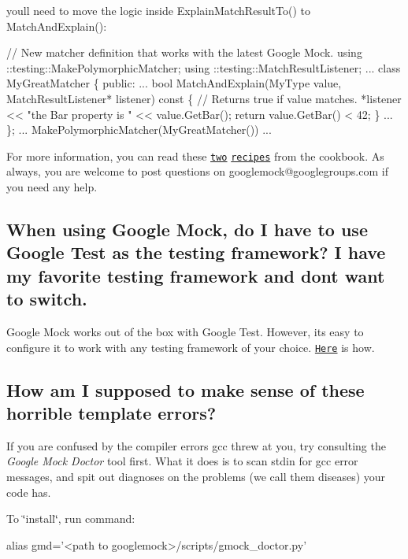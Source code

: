 you\textquotesingle{}ll need to move the logic inside {\ttfamily Explain\+Match\+Result\+To()} to {\ttfamily Match\+And\+Explain()}\+: 
\begin{DoxyCode}
\textcolor{comment}{// New matcher definition that works with the latest Google Mock.}
using ::testing::MakePolymorphicMatcher;
using ::testing::MatchResultListener;
...
class MyGreatMatcher \{
 \textcolor{keyword}{public}:
  ...
  \textcolor{keywordtype}{bool} MatchAndExplain(MyType value,
                       MatchResultListener* listener)\textcolor{keyword}{ const }\{
    \textcolor{comment}{// Returns true if value matches.}
    *listener << \textcolor{stringliteral}{"the Bar property is "} << value.GetBar();
    \textcolor{keywordflow}{return} value.GetBar() < 42;
  \}
  ...
\};
... MakePolymorphicMatcher(MyGreatMatcher()) ...
\end{DoxyCode}


For more information, you can read these \href{CookBook.md#writing-new-monomorphic-matchers}{\tt two} \href{CookBook.md#writing-new-polymorphic-matchers}{\tt recipes} from the cookbook. As always, you are welcome to post questions on {\ttfamily googlemock@googlegroups.\+com} if you need any help.

\subsection*{When using Google Mock, do I have to use Google Test as the testing framework? I have my favorite testing framework and don\textquotesingle{}t want to switch.}

Google Mock works out of the box with Google Test. However, it\textquotesingle{}s easy to configure it to work with any testing framework of your choice. \href{ForDummies.md#using-google-mock-with-any-testing-framework}{\tt Here} is how.

\subsection*{How am I supposed to make sense of these horrible template errors?}

If you are confused by the compiler errors gcc threw at you, try consulting the {\itshape Google Mock Doctor} tool first. What it does is to scan stdin for gcc error messages, and spit out diagnoses on the problems (we call them diseases) your code has.

To \char`\"{}install\char`\"{}, run command\+: 
\begin{DoxyCode}
alias gmd='<path to googlemock>/scripts/gmock\_doctor.py'
\end{DoxyCode}


